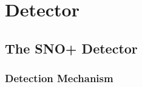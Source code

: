 
\chapter{Detector}

\ifpdf
    \graphicspath{{detector/figures/PNG/}{detector/figures/PDF/}{detector/figures/}}
\else
    \graphicspath{{detector/figures/EPS/}{detector/figures/}}
\fi


\section{The SNO+ Detector}
\subsection{Detection Mechanism}


